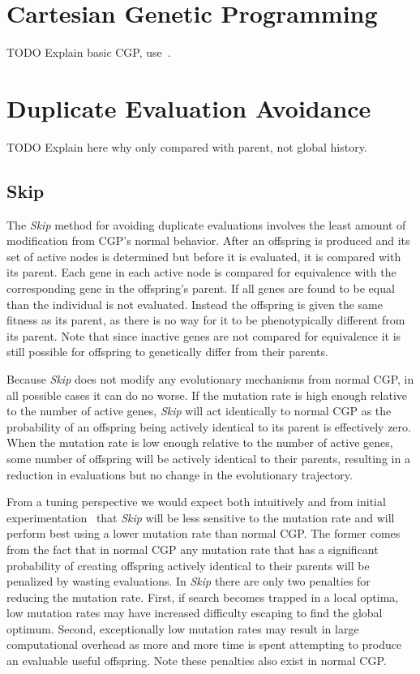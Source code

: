 \documentclass[journal]{IEEEtran}
\begin{document}
\section{Cartesian Genetic Programming}
TODO Explain basic CGP, use~\cite{miller:2011:chapter2}.

\section{Duplicate Evaluation Avoidance}

TODO Explain here why only compared with parent, not global history.

\subsection{Skip}
The \emph{Skip} method for avoiding duplicate evaluations involves the least
amount of modification from CGP's normal behavior.  After an offspring is produced
and its set of active nodes is determined but before it is evaluated, it is compared
with its parent.  Each gene in each active node is compared for equivalence with
the corresponding gene in the offspring's parent.  If all genes are found to be equal
than the individual is not evaluated.  Instead the offspring is given the same fitness
as its parent, as there is no way for it to be phenotypically different from its parent.
Note that since inactive genes are not compared for equivalence it is still possible
for offspring to genetically differ from their parents.

Because \emph{Skip} does not modify any evolutionary mechanisms from normal CGP,
in all possible cases it can do no worse.  If the mutation rate is high enough relative
to the number of active genes, \emph{Skip} will act identically to normal CGP as
the probability of an offspring being actively identical to its parent is effectively zero.
When the mutation rate is low enough relative to the number of active genes, some number of
offspring will be actively identical to their parents, resulting in a reduction in evaluations
but no change in the evolutionary trajectory.

From a tuning perspective we would expect both intuitively and from initial
experimentation~\cite{goldman:2013:cgpwaste} that \emph{Skip} will be less sensitive
to the mutation rate and will perform best using a lower mutation rate than normal CGP.
The former comes from the fact that in normal CGP any mutation rate that has a significant
probability of creating offspring actively identical to their parents will be penalized
by wasting evaluations.  In \emph{Skip} there are only two penalties for reducing the
mutation rate.  First, if search becomes trapped in a local optima, low mutation
rates may have increased difficulty escaping to find the global optimum.  Second,
exceptionally low mutation rates may result in large computational overhead as
more and more time is spent attempting to produce an evaluable useful offspring.
Note these penalties also exist in normal CGP.
\end{document}
